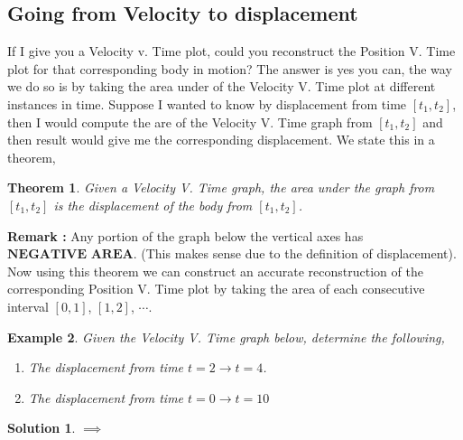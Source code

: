 \documentclass[12pt]{article}
\newcommand{\tx}[1]{\text{#1}}
\theoremstyle{break}
\newtheorem{thm}{Theorem}[subsection]
\newtheorem{ex}[thm]{Example}
\newtheorem*{soln}{Solution}
\begin{document}
\newpage
\subsection{Going from Velocity to displacement}
If I give you a Velocity v. Time plot, could you reconstruct the Position V. Time plot for that corresponding body in motion? The answer is yes you can, the way we do so is by taking the area under of the Velocity V. Time plot at different instances in time. Suppose I wanted to know by displacement from time $[t_1,t_2]$, then I would compute the are of the Velocity V. Time graph from $[t_1,t_2]$ and then result would give me the corresponding displacement. We state this in a theorem,
\begin{thm}
Given a Velocity V. Time graph, the area under the graph from $[t_1,t_2]$ is the displacement of the body from $[t_1,t_2]$.
\end{thm}
\textbf{Remark :} Any portion of the graph below the vertical axes has $\textbf{NEGATIVE AREA}$. (This makes sense due to the definition of displacement).\\
Now using this theorem we can construct an accurate reconstruction of the corresponding Position V. Time plot by taking the area of each consecutive interval $[0,1]$, $[1,2]$, $\cdots$. 
\begin{ex}
	Given the Velocity V. Time graph below, determine the following,
	\begin{enumerate}[label = (\alph*)]
		\item The displacement from time $t=2 \rightarrow t=4$.
		\item The displacement from time $t = 0 \rightarrow t = 10$
	\end{enumerate}




\end{ex}

\begin{soln}
$\implies$
\vspace*{15cm}
\end{soln}




	
\end{document}
